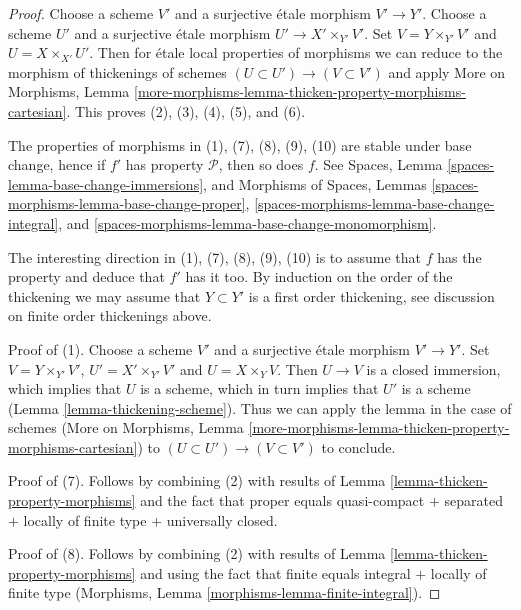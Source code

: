 \documentclass[10pt,a4paper]{amsart}
\theoremstyle{plain}
\theoremstyle{definition}
\theoremstyle{remark}
\numberwithin{equation}{subsection}
\begin{document}
\begin{proof}
Choose a scheme $V'$ and a surjective \'etale morphism $V' \to Y'$.
Choose a scheme $U'$ and a surjective \'etale morphism
$U' \to X' \times_{Y'} V'$. Set $V = Y \times_{Y'} V'$ and
$U = X \times_{X'} U'$. Then for \'etale local properties of morphisms
we can reduce to the morphism of thickenings of schemes
$(U \subset U') \to (V \subset V')$ and apply More on Morphisms, Lemma
\ref{more-morphisms-lemma-thicken-property-morphisms-cartesian}.
This proves (2), (3), (4), (5), and (6).

\medskip\noindent
The properties of morphisms in (1), (7), (8), (9), (10) are stable
under base change, hence if $f'$ has property $\mathcal{P}$, then so
does $f$. See
Spaces, Lemma \ref{spaces-lemma-base-change-immersions},
and
Morphisms of Spaces, Lemmas
\ref{spaces-morphisms-lemma-base-change-proper},
\ref{spaces-morphisms-lemma-base-change-integral}, and
\ref{spaces-morphisms-lemma-base-change-monomorphism}.

\medskip\noindent
The interesting direction in (1), (7), (8), (9), (10) is to assume
that $f$ has the property and deduce that $f'$ has it too.
By induction on the order of the thickening we may
assume that $Y \subset Y'$ is a first order thickening, see
discussion on finite order thickenings above.

\medskip\noindent
Proof of (1). Choose a scheme $V'$ and a surjective \'etale morphism
$V' \to Y'$. Set $V = Y \times_{Y'} V'$, $U' = X' \times_{Y'} V'$
and $U = X \times_Y V$. Then $U \to V$ is a closed immersion, which
implies that $U$ is a scheme, which in turn implies that $U'$ is
a scheme (Lemma \ref{lemma-thickening-scheme}). Thus we can apply
the lemma in the case of schemes
(More on Morphisms, Lemma
\ref{more-morphisms-lemma-thicken-property-morphisms-cartesian})
to $(U \subset U') \to (V \subset V')$ to conclude.

\medskip\noindent
Proof of (7). Follows by combining (2) with
results of Lemma \ref{lemma-thicken-property-morphisms}
and the fact that proper equals quasi-compact $+$
separated $+$ locally of finite type $+$ universally closed.

\medskip\noindent
Proof of (8). Follows by combining (2) with
results of Lemma \ref{lemma-thicken-property-morphisms}
and using the fact that finite equals integral $+$ locally
of finite type (Morphisms, Lemma \ref{morphisms-lemma-finite-integral}).


\end{proof}
\end{document}
